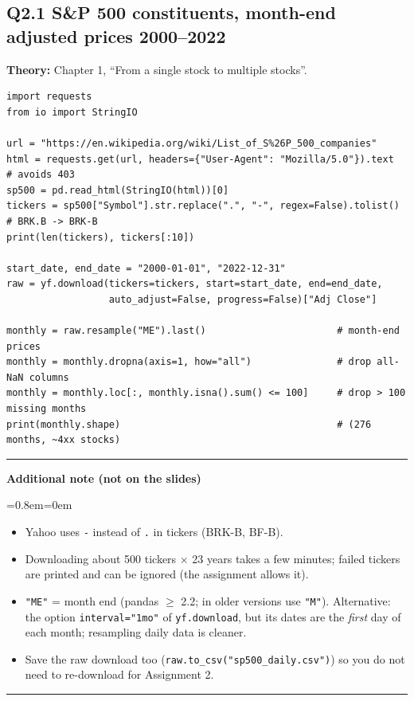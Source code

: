 \documentclass[11pt,a4paper]{report}
\newenvironment{notebox}[1]
  {\par\medskip\Needspace{6\baselineskip}\noindent\rule{\linewidth}{0.4pt}\par\nopagebreak
   \noindent\textbf{#1}\par\nopagebreak
   \begin{list}{}{\leftmargin=0.8em\rightmargin=0em\topsep=2pt}\item[]}
  {\end{list}\nopagebreak\noindent\rule{\linewidth}{0.4pt}\par\medskip}
\newenvironment{addnote}{\begin{notebox}{Additional note (not on the slides)}}{\end{notebox}}
\begin{document}
\subsection*{Q2.1 S\&P 500 constituents, month-end adjusted prices 2000--2022}
\textbf{Theory:} Chapter 1, ``From a single stock to multiple stocks''.
\begin{lstlisting}
import requests
from io import StringIO

url = "https://en.wikipedia.org/wiki/List_of_S%26P_500_companies"
html = requests.get(url, headers={"User-Agent": "Mozilla/5.0"}).text  # avoids 403
sp500 = pd.read_html(StringIO(html))[0]
tickers = sp500["Symbol"].str.replace(".", "-", regex=False).tolist()  # BRK.B -> BRK-B
print(len(tickers), tickers[:10])

start_date, end_date = "2000-01-01", "2022-12-31"
raw = yf.download(tickers=tickers, start=start_date, end=end_date,
                  auto_adjust=False, progress=False)["Adj Close"]

monthly = raw.resample("ME").last()                       # month-end prices
monthly = monthly.dropna(axis=1, how="all")               # drop all-NaN columns
monthly = monthly.loc[:, monthly.isna().sum() <= 100]     # drop > 100 missing months
print(monthly.shape)                                      # (276 months, ~4xx stocks)
\end{lstlisting}
\begin{addnote}
\begin{itemize}
  \item Yahoo uses \texttt{-} instead of \texttt{.} in tickers (BRK-B, BF-B).
  \item Downloading about 500 tickers $\times$ 23 years takes a few minutes; failed
    tickers are printed and can be ignored (the assignment allows it).
  \item \texttt{"ME"} = month end (pandas $\ge$ 2.2; in older versions use \texttt{"M"}).
    Alternative: the option \texttt{interval="1mo"} of \texttt{yf.download}, but its dates are the
    \emph{first} day of each month; resampling daily data is cleaner.
  \item Save the raw download too (\texttt{raw.to\_csv("sp500\_daily.csv")}) so you do
    not need to re-download for Assignment 2.
\end{itemize}
\end{addnote}
\end{document}
